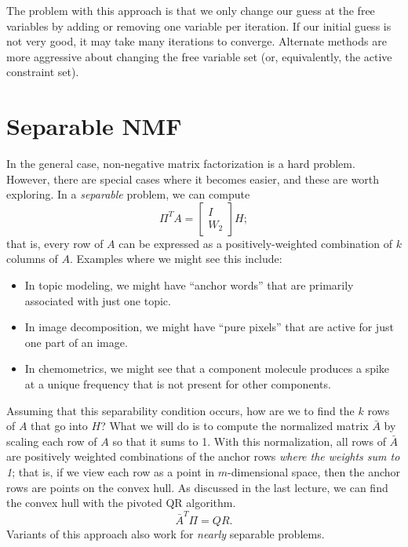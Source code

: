 \documentclass[12pt, leqno]{article} %
\begin{document}
The problem with this approach is that we only change our guess
at the free variables by adding or removing one variable per
iteration.  If our initial guess is not very good, it may take many
iterations to converge.  Alternate methods are more aggressive about
changing the free variable set (or, equivalently, the active
constraint set).

\section{Separable NMF}

In the general case, non-negative matrix factorization is a hard
problem.  However, there are special cases where it becomes easier,
and these are worth exploring.  In a {\em separable} problem, we
can compute
\[
  \Pi^T A = \begin{bmatrix} I \\ W_2 \end{bmatrix} H;
\]
that is, every row of $A$ can be expressed as a positively-weighted
combination of $k$ columns of $A$.  Examples where we might see this
include:
\begin{itemize}
\item In topic modeling, we might have ``anchor words'' that are
  primarily associated with just one topic.
\item In image decomposition, we might have ``pure pixels'' that are
  active for just one part of an image.
\item In chemometrics, we might see that a component molecule
  produces a spike at a unique frequency that is not present for other
  components.
\end{itemize}
Assuming that this separability condition occurs, how are we to find
the $k$ rows of $A$ that go into $H$?  What we will do is to compute
the normalized matrix $\bar{A}$ by scaling each row of $A$ so that it
sums to 1.  With this normalization, all rows of $\bar{A}$ are
positively weighted combinations of the anchor rows
{\em where the weights sum to 1}; that is, if we view each row as a
point in $m$-dimensional space, then the anchor rows are points
on the convex hull.  As discussed in the last lecture, we can find
the convex hull with the pivoted QR algorithm.
\[
  \bar{A}^T \Pi = QR.
\]
Variants of this approach also work for {\em nearly} separable problems.
\end{document}
